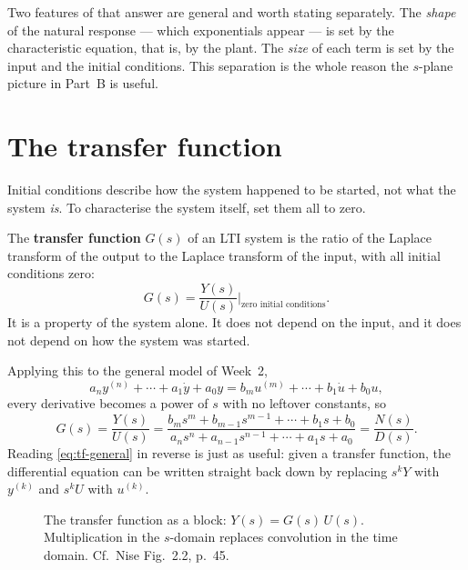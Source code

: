 \documentclass[11pt,a4paper]{article}
\begin{document}
Two features of that answer are general and worth stating separately. The
\emph{shape} of the natural response --- which exponentials appear --- is set
by the characteristic equation, that is, by the plant. The \emph{size} of each
term is set by the input and the initial conditions. This separation is the
whole reason the $s$-plane picture in Part~B is useful.

\section{The transfer function}
\label{sec:tf}

Initial conditions describe how the system happened to be started, not what the
system \emph{is}. To characterise the system itself, set them all to zero.

\begin{keyidea}
The \textbf{transfer function} $G(s)$ of an LTI system is the ratio of the
Laplace transform of the output to the Laplace transform of the input, with all
initial conditions zero:
\[
  G(s) = \frac{Y(s)}{U(s)}\bigg|_{\text{zero initial conditions}} .
\]
It is a property of the system alone. It does not depend on the input, and it
does not depend on how the system was started.
\end{keyidea}

Applying this to the general model of Week~2,
\[
  a_n y^{(n)} + \cdots + a_1\dot y + a_0 y
  = b_m u^{(m)} + \cdots + b_1\dot u + b_0 u ,
\]
every derivative becomes a power of $s$ with no leftover constants, so
\begin{equation}
  G(s) = \frac{Y(s)}{U(s)}
       = \frac{b_m s^{m} + b_{m-1}s^{m-1} + \cdots + b_1 s + b_0}
              {a_n s^{n} + a_{n-1}s^{n-1} + \cdots + a_1 s + a_0}
       = \frac{N(s)}{D(s)} .
  \label{eq:tf-general}
\end{equation}
Reading \eqref{eq:tf-general} in reverse is just as useful: given a transfer
function, the differential equation can be written straight back down by
replacing $s^k Y$ with $y^{(k)}$ and $s^k U$ with $u^{(k)}$.

\begin{figure}[htbp]
\centering
{}
\caption{The transfer function as a block: $Y(s)=G(s)\,U(s)$. Multiplication in
the $s$-domain replaces convolution in the time domain. Cf.\ Nise Fig.~2.2,
p.~45.}
\label{fig:tf-block}
\end{figure}
\end{document}
